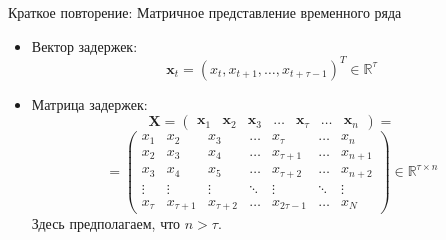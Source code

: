 
\usepackage{tikz}
\usepackage{amsmath}
\usepackage[english,russian]{babel}
\usepackage[labelformat=empty]{caption}

\usepackage{graphicx,animate}
\usepackage{animate}
\usepackage{svg}
\usepackage{subcaption}

\usepackage{ stmaryrd }

\usetikzlibrary{arrows,shapes,positioning,shadows,trees}
\newcommand*{\defeq}{\stackrel{\text{def}}{=}}
\newcommand{\tensor}[1]{\underline{\textbf{#1}}}
\newcommand{\M}[1]{\textbf{#1}}
\newcommand{\norm}[1]{\lVert #1 \rVert }

\begin{frame}[plain]
\titlepage
\end{frame}

\begin{frame}{Краткое повторение: Матричное представление временного ряда}
\begin{itemize}
    \item Вектор задержек: 
    $$ \mathbf{x}_t = (x_t, x_{t+1}, \dots, x_{t + \tau - 1})^T \in \mathbb{R}^{\tau}$$
    \item Матрица задержек:
    $$\mathbf{X} = 
    \begin{pmatrix}
    \mathbf{x}_1 & \mathbf{x}_2 & \mathbf{x}_3 & \dots & \mathbf{x}_{\tau} & \dots & \mathbf{x}_n
    \end{pmatrix} = $$
    $$ = \begin{pmatrix}
    x_1 & x_2 & x_3 & \dots & x_{\tau} & \dots & x_n \\
    x_2 & x_3 & x_4 & \dots & x_{\tau + 1} & \dots & x_{n + 1} \\
    x_3 & x_4 & x_5 & \dots & x_{\tau + 2} & \dots & x_{n + 2} \\
    \vdots & \vdots & \vdots & \ddots & \vdots & \ddots & \vdots \\
    x_{\tau} & x_{\tau + 1} & x_{\tau + 2} & \dots & x_{2\tau - 1} & \dots & x_N 
    \end{pmatrix} \in \mathbb{R}^{\tau \times n}$$
    Здесь предполагаем, что $n > \tau$.
\end{itemize}
\end{frame}


